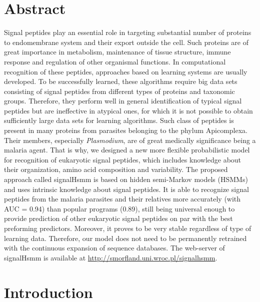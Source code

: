 \documentclass[10pt,letterpaper]{article}
\begin{document}
\section*{Abstract}
Signal peptides play an essential role in targeting substantial number of proteins to endomembrane system and their export outside the cell. Such proteins are of great importance in metabolism, maintenance of tissue structure, immune response and regulation of other organismal functions. In computational recognition of these peptides, approaches based on learning systems are usually developed. To be successfully learned, these algorithms require big data sets consisting of signal peptides from different types of proteins and taxonomic groups. Therefore, they perform well in general identification of typical signal peptides but are ineffective in atypical ones, for which it is not possible to obtain sufficiently large data sets for  learning algorithms. Such class of peptides is present in many proteins from parasites belonging to the phylum Apicomplexa. Their members, especially \textit{Plasmodium}, are of great medically significance being a malaria agent. That is why, we designed a new more flexible probabilistic model for recognition of eukaryotic signal peptides, which includes knowledge about their organization, amino acid composition and variability. The proposed approach called signalHsmm is based on hidden semi-Markov models (HSMMs) and uses intrinsic knowledge about signal peptides. It is able to recognize signal peptides from the malaria parasites and their relatives more accurately (with AUC = 0.94) than popular programs (0.89), still being universal enough to provide prediction of other eukaryotic signal peptides on par with the best preforming predictors. Moreover, it proves to be very stable regardless of type of learning data. Therefore, our model does not need to be permanently retrained with the continuous expansion of sequence databases. The web-server of signalHsmm is available at \url{http://smorfland.uni.wroc.pl/signalhsmm}.




\linenumbers

\section*{Introduction}
\end{document}
